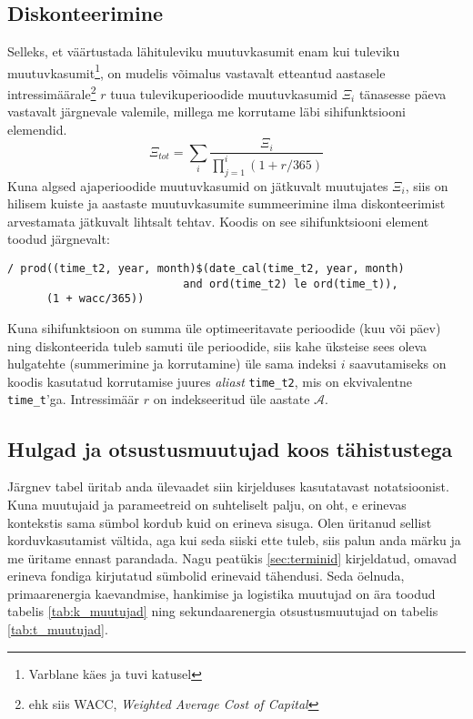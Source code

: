 \documentclass[10pt,a4paper]{article}
\begin{document}
\subsection{Diskonteerimine}
Selleks, et väärtustada lähituleviku muutuvkasumit enam kui tuleviku muutuvkasumit\footnote{Varblane käes ja tuvi katusel}, on mudelis võimalus vastavalt etteantud aastasele intressimäärale\footnote{ehk siis WACC, \emph{Weighted Average Cost of Capital}} $r$ tuua tulevikuperioodide muutuvkasumid $\Xi_i$ tänasesse päeva vastavalt järgnevale valemile, millega me korrutame läbi sihifunktsiooni elemendid.
\begin{equation}
\Xi_{tot} = \sum_i \frac{\Xi_i}{\prod_{j=1}^i(1+r/365)}
\end{equation}
Kuna algsed ajaperioodide muutuvkasumid on jätkuvalt muutujates $\Xi_i$, siis on hilisem kuiste ja aastaste muutuvkasumite summeerimine ilma diskonteerimist arvestamata jätkuvalt lihtsalt tehtav.
Koodis on see sihifunktsiooni element toodud järgnevalt:
\begin{verbatim}
/ prod((time_t2, year, month)$(date_cal(time_t2, year, month)
                           and ord(time_t2) le ord(time_t)),
      (1 + wacc/365))
\end{verbatim}
Kuna sihifunktsioon on summa üle optimeeritavate perioodide (kuu või päev) ning diskonteerida tuleb samuti üle perioodide, siis kahe üksteise sees oleva hulgatehte (summerimine ja korrutamine) üle sama indeksi $i$ saavutamiseks on koodis kasutatud korrutamise juures \emph{aliast} \texttt{time\_t2}, mis on ekvivalentne \texttt{time\_t}'ga. Intressimäär $r$ on indekseeritud üle aastate $\mathcal{A}$.

\subsection{Hulgad ja otsustusmuutujad koos tähistustega}
Järgnev tabel üritab anda ülevaadet siin kirjelduses kasutatavast notatsioonist. Kuna muutujaid ja parameetreid on suhteliselt palju, on oht, e erinevas kontekstis sama sümbol kordub kuid on erineva sisuga. Olen üritanud sellist korduvkasutamist vältida, aga kui seda siiski ette tuleb, siis palun anda märku ja me üritame ennast parandada. Nagu peatükis \ref{sec:terminid} kirjeldatud, omavad erineva fondiga kirjutatud sümbolid erinevaid tähendusi. Seda öelnuda, primaarenergia kaevandmise, hankimise ja logistika muutujad on ära toodud tabelis \ref{tab:k_muutujad} ning sekundaarenergia otsustusmuutujad on tabelis \ref{tab:t_muutujad}.
\end{document}
